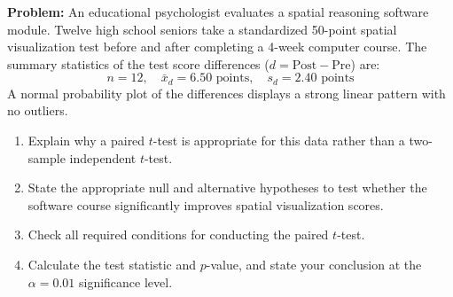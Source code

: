\begin{frqrubricbox}
\textbf{Problem:} An educational psychologist evaluates a spatial reasoning software module. Twelve high school seniors take a standardized 50-point spatial visualization test before and after completing a 4-week computer course.
The summary statistics of the test score differences ($d = \text{Post} - \text{Pre}$) are:
\[ n = 12, \quad \bar{x}_d = 6.50\text{ points}, \quad s_d = 2.40\text{ points} \]
A normal probability plot of the differences displays a strong linear pattern with no outliers.
\begin{enumerate}[label=(\alph*)]
  \item Explain why a paired $t$-test is appropriate for this data rather than a two-sample independent $t$-test.
  \item State the appropriate null and alternative hypotheses to test whether the software course significantly improves spatial visualization scores.
  \item Check all required conditions for conducting the paired $t$-test.
  \item Calculate the test statistic and $p$-value, and state your conclusion at the $\alpha = 0.01$ significance level.
\end{enumerate}


\end{frqrubricbox}
